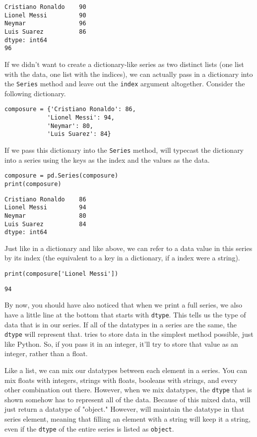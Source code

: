 \begin{lstlisting}
Cristiano Ronaldo    90
Lionel Messi         90
Neymar               96
Luis Suarez          86
dtype: int64
96
\end{lstlisting}
If we didn't want to create a dictionary-like series as two distinct lists (one list with the data, one list with the indices), we can actually pass in a dictionary into the \verb|Series| method and leave out the \verb|index| argument altogether. Consider the following dictionary.
\begin{lstlisting}[style=pippython]
composure = {'Cristiano Ronaldo': 86,
            'Lionel Messi': 94,
            'Neymar': 80,
            'Luis Suarez': 84}
\end{lstlisting}
If we pass this dictionary into the \verb|Series| method,  will typecast the dictionary into a series using the keys as the index and the values as the data.
\begin{lstlisting}[style=pippython]
composure = pd.Series(composure)
print(composure)
\end{lstlisting}
\begin{lstlisting}
Cristiano Ronaldo    86
Lionel Messi         94
Neymar               80
Luis Suarez          84
dtype: int64
\end{lstlisting}
Just like in a dictionary and like above, we can refer to a data value in this series by its index (the equivalent to a key in a dictionary, if a index were a string).
\begin{lstlisting}[style=pippython]
print(composure['Lionel Messi'])
\end{lstlisting}
\begin{lstlisting}
94
\end{lstlisting}
By now, you should have also noticed that when we print a full series, we also have a little line at the bottom that starts with \verb|dtype|. This tells us the type of data that is in our series. If all of the datatypes in a series are the same, the \verb|dtype| will represent that.  tries to store data in the simplest method possible, just like Python. So, if you pass it in an integer, it'll try to store that value as an integer, rather than a float.\par
Like a list, we can mix our datatypes between each element in a series. You can mix floats with integers, strings with floats, booleans with strings, and every other combination out there. However, when we mix datatypes, the \verb|dtype| that is shown somehow has to represent all of the data. Because of this mixed data,  will just return a datatype of "object." However,  will maintain the datatype in that series element, meaning that filling an element with a string will keep it a string, even if the \verb|dtype| of the entire series is listed as \verb|object|.
